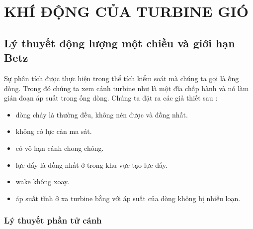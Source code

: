 \documentclass[LY_THUYET_CHONG_CHONG.tex]{subfiles}
\begin{document}
\chapter{KHÍ ĐỘNG CỦA TURBINE GIÓ}
\section{Lý thuyết động lượng một chiều và giới hạn Betz}
Sự phân tích được thực hiện trong thể tích kiểm soát mà chúng ta gọi là ống dòng. Trong đó chúng ta xem cánh turbine như là một đĩa chấp hành và nó làm gián đoạn áp suất trong ống dòng. Chúng ta đặt ra các giả thiết sau :
\begin{itemize}
    \item dòng chảy là thường đều, không nén được và đồng nhất.
    \item không có lực cản ma sát.
    \item có vô hạn cánh chong chóng.
    \item lực đẩy là đồng nhất ở trong khu vực tạo lực đẩy.
    \item wake không xoay.
    \item áp suất tĩnh ở xa turbine bằng với áp suất của dòng không bị nhiễu loạn.
\end{itemize}

\subsection{Lý thuyết phần tử cánh}
\end{document}
